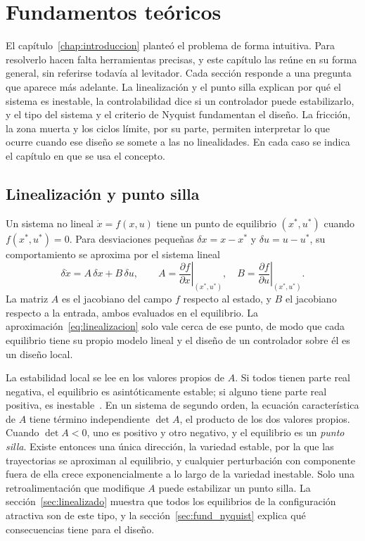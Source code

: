 \chapter{Fundamentos teóricos}\label{chap:fundamentos}

El capítulo~\ref{chap:introduccion} planteó el problema de forma intuitiva. Para resolverlo hacen falta herramientas precisas, y este capítulo las reúne en su forma general, sin referirse todavía al levitador. Cada sección responde a una pregunta que aparece más adelante. La linealización y el punto silla explican por qué el sistema es inestable, la controlabilidad dice si un controlador puede estabilizarlo, y el tipo del sistema y el criterio de Nyquist fundamentan el diseño. La fricción, la zona muerta y los ciclos límite, por su parte, permiten interpretar lo que ocurre cuando ese diseño se somete a las no linealidades. En cada caso se indica el capítulo en que se usa el concepto.

\section{Linealización y punto silla}\label{sec:fund_linealizacion}

Un sistema no lineal $\dot{x}=f(x,u)$ tiene un punto de equilibrio $(x^*,u^*)$ cuando $f(x^*,u^*)=0$. Para desviaciones pequeñas $\delta x = x-x^*$ y $\delta u = u-u^*$, su comportamiento se aproxima por el sistema lineal
\begin{equation}
\delta\dot{x} = A\,\delta x + B\,\delta u, \qquad
A=\left.\frac{\partial f}{\partial x}\right|_{(x^*,u^*)}, \quad
B=\left.\frac{\partial f}{\partial u}\right|_{(x^*,u^*)} .
\label{eq:linealizacion}
\end{equation}
La matriz $A$ es el jacobiano del campo $f$ respecto al estado, y $B$ el jacobiano respecto a la entrada, ambos evaluados en el equilibrio. La aproximación~\eqref{eq:linealizacion} solo vale cerca de ese punto, de modo que cada equilibrio tiene su propio modelo lineal y el diseño de un controlador sobre él es un diseño local.

La estabilidad local se lee en los valores propios de $A$. Si todos tienen parte real negativa, el equilibrio es asintóticamente estable; si alguno tiene parte real positiva, es inestable~\cite{khalil2}. En un sistema de segundo orden, la ecuación característica de $A$ tiene término independiente $\det A$, el producto de los dos valores propios. Cuando $\det A<0$, uno es positivo y otro negativo, y el equilibrio es un \emph{punto silla}. Existe entonces una única dirección, la variedad estable, por la que las trayectorias se aproximan al equilibrio, y cualquier perturbación con componente fuera de ella crece exponencialmente a lo largo de la variedad inestable. Solo una retroalimentación que modifique $A$ puede estabilizar un punto silla. La sección~\ref{sec:linealizado} muestra que todos los equilibrios de la configuración atractiva son de este tipo, y la sección~\ref{sec:fund_nyquist} explica qué consecuencias tiene para el diseño.

